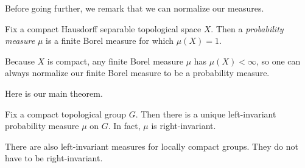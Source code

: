 \documentclass[../notes.tex]{subfiles}
\begin{document}
Before going further, we remark that we can normalize our measures.
\begin{definition}[probability]
	Fix a compact Hausdorff separable topological space $X$. Then a \textit{probability measure} $\mu$ is a finite Borel measure for which $\mu(X)=1$.
\end{definition}
\begin{remark}
	Because $X$ is compact, any finite Borel measure $\mu$ has $\mu(X)<\infty$, so one can always normalize our finite Borel measure to be a probability measure.
\end{remark}
Here is our main theorem.
\begin{theorem} \label{thm:haar-measure}
	Fix a compact topological group $G$. Then there is a unique left-invariant probability measure $\mu$ on $G$. In fact, $\mu$ is right-invariant.
\end{theorem}
\begin{remark}
	There are also left-invariant measures for locally compact groups. They do not have to be right-invariant.
\end{remark}
\end{document}
